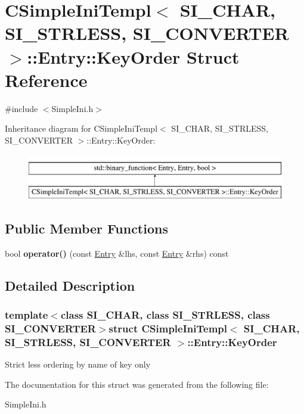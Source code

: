 \hypertarget{a00027}{}\section{C\+Simple\+Ini\+Templ$<$ S\+I\+\_\+\+C\+H\+A\+R, S\+I\+\_\+\+S\+T\+R\+L\+E\+S\+S, S\+I\+\_\+\+C\+O\+N\+V\+E\+R\+T\+E\+R $>$\+:\+:Entry\+:\+:Key\+Order Struct Reference}
\label{a00027}


{\ttfamily \#include $<$Simple\+Ini.\+h$>$}

Inheritance diagram for C\+Simple\+Ini\+Templ$<$ S\+I\+\_\+\+C\+H\+A\+R, S\+I\+\_\+\+S\+T\+R\+L\+E\+S\+S, S\+I\+\_\+\+C\+O\+N\+V\+E\+R\+T\+E\+R $>$\+:\+:Entry\+:\+:Key\+Order\+:\begin{figure}[H]
\begin{center}
\leavevmode
\includegraphics[height=2.000000cm]{a00027}
\end{center}
\end{figure}
\subsection*{Public Member Functions}
\begin{DoxyCompactItemize}
\item 
\hypertarget{a00027_a4cfcbc71e83cc369f55643c715609176}{}bool {\bfseries operator()} (const \hyperlink{a00015}{Entry} \&lhs, const \hyperlink{a00015}{Entry} \&rhs) const \label{a00027_a4cfcbc71e83cc369f55643c715609176}

\end{DoxyCompactItemize}


\subsection{Detailed Description}
\subsubsection*{template$<$class S\+I\+\_\+\+C\+H\+A\+R, class S\+I\+\_\+\+S\+T\+R\+L\+E\+S\+S, class S\+I\+\_\+\+C\+O\+N\+V\+E\+R\+T\+E\+R$>$struct C\+Simple\+Ini\+Templ$<$ S\+I\+\_\+\+C\+H\+A\+R, S\+I\+\_\+\+S\+T\+R\+L\+E\+S\+S, S\+I\+\_\+\+C\+O\+N\+V\+E\+R\+T\+E\+R $>$\+::\+Entry\+::\+Key\+Order}

Strict less ordering by name of key only 

The documentation for this struct was generated from the following file\+:\begin{DoxyCompactItemize}
\item 
Simple\+Ini.\+h\end{DoxyCompactItemize}
